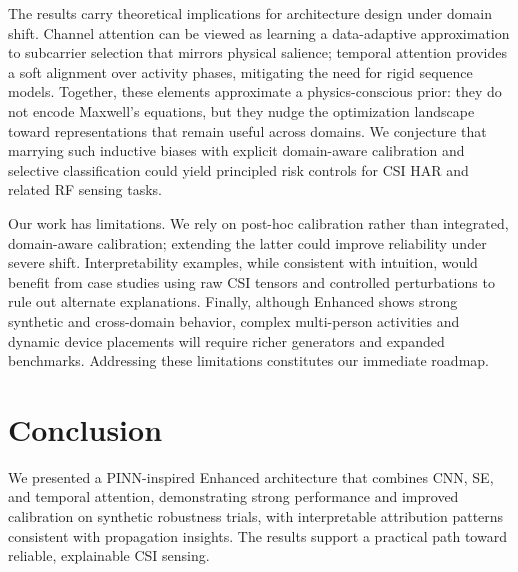 \documentclass[journal]{IEEEtran}
\begin{document}
The results carry theoretical implications for architecture design under domain shift. Channel attention can be viewed as learning a data-adaptive approximation to subcarrier selection that mirrors physical salience; temporal attention provides a soft alignment over activity phases, mitigating the need for rigid sequence models. Together, these elements approximate a physics-conscious prior: they do not encode Maxwell’s equations, but they nudge the optimization landscape toward representations that remain useful across domains. We conjecture that marrying such inductive biases with explicit domain-aware calibration and selective classification could yield principled risk controls for CSI HAR and related RF sensing tasks.

Our work has limitations. We rely on post-hoc calibration rather than integrated, domain-aware calibration; extending the latter could improve reliability under severe shift. Interpretability examples, while consistent with intuition, would benefit from case studies using raw CSI tensors and controlled perturbations to rule out alternate explanations. Finally, although Enhanced shows strong synthetic and cross-domain behavior, complex multi-person activities and dynamic device placements will require richer generators and expanded benchmarks. Addressing these limitations constitutes our immediate roadmap.

\section{Conclusion}
We presented a PINN-inspired Enhanced architecture that combines CNN, SE, and temporal attention, demonstrating strong performance and improved calibration on synthetic robustness trials, with interpretable attribution patterns consistent with propagation insights. The results support a practical path toward reliable, explainable CSI sensing.



\end{document}
